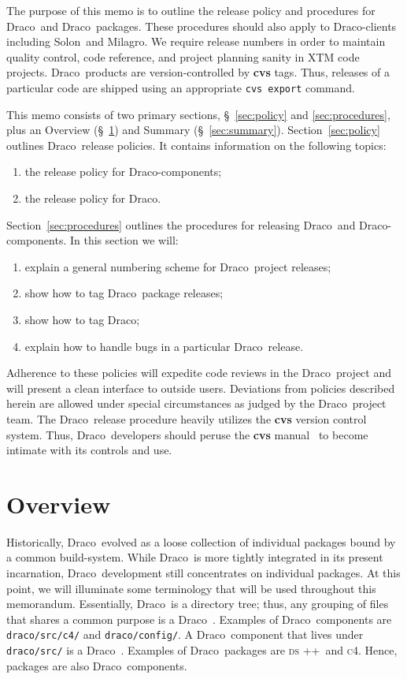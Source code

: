 \documentclass[11pt]{nmemo}
\newcommand{\draco}{{\normalfont\normalsize\sffamily Draco}}
\newcommand{\milagro}{{\normalfont\normalsize\sffamily Milagro}}
\newcommand{\solon}{{\normalfont\normalsize\sffamily Solon}}
\newcommand{\cfour}{{\normalfont\normalsize\scshape c\small 4}}
\newcommand{\dsxx}{{\normalfont\normalsize\scshape ds\raisebox{.2ex}
  {\scriptsize ++}}}
\begin{document}
The purpose of this memo is to outline the release policy and
procedures for \draco\ and \draco\ packages.  These procedures should
also apply to \draco-clients including \solon\ and \milagro.  We
require release numbers in order to maintain quality control, code
reference, and project planning sanity in XTM code projects.  \draco\ 
products are version-controlled by {\bf cvs} tags.  Thus, releases of
a particular code are shipped using an appropriate \texttt{cvs export}
command.

This memo consists of two primary sections, \S~\ref{sec:policy} and
\ref{sec:procedures}, plus an Overview (\S~\ref{sec:overview}) and
Summary (\S~\ref{sec:summary}).  Section~\ref{sec:policy} outlines
\draco\ release policies.  It contains information on the following
topics:
\begin{enumerate}
\item the release policy for \draco-components;
\item the release policy for \draco.
\end{enumerate}
Section~\ref{sec:procedures} outlines the procedures for releasing
\draco\ and \draco-components.  In this section we will:
\begin{enumerate}
\item explain a general numbering scheme for \draco\ project releases;
\item show how to tag \draco\ package releases;
\item show how to tag \draco;
\item explain how to handle bugs in a particular \draco\ release.
\end{enumerate}
Adherence to these policies will expedite code reviews in the \draco\ 
project and will present a clean interface to outside users.
Deviations from policies described herein are allowed under special
circumstances as judged by the \draco\ project team.  The \draco\ 
release procedure heavily utilizes the {\bf cvs} version control
system.  Thus, \draco\ developers should peruse the {\bf cvs}
manual~\cite{cvs} to become intimate with its controls and use.


\section{Overview}
\label{sec:overview}

Historically, \draco\ evolved as a loose collection of individual
packages bound by a common build-system.  While \draco\ is more
tightly integrated in its present incarnation, \draco\ development
still concentrates on individual packages.  At this point, we will
illuminate some terminology that will be used throughout this
memorandum.  Essentially, \draco\ is a directory tree; thus, any
grouping of files that shares a common purpose is a \draco\ 
.  Examples of \draco\ components are
\texttt{draco/src/c4/} and \texttt{draco/config/}.  A \draco\ 
component that lives under \texttt{draco/src/} is a \draco\ 
.  Examples of \draco\ packages are \dsxx\ and \cfour.
Hence, packages are also \draco\ components.  
\end{document}
